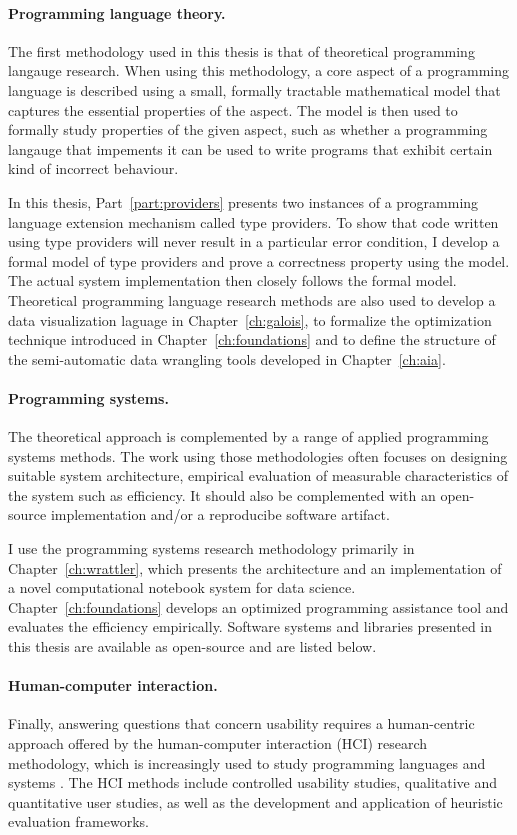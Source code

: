 \documentclass[fleqn,11pt]{report}
\theoremstyle{definition}
\begin{document}
\paragraph{Programming language theory.}
The first methodology used in this thesis is that of theoretical programming langauge research.
When using this methodology, a core aspect of a programming language is described using a small,
formally tractable mathematical model that captures the essential properties of the aspect.
The model is then used to formally study properties of the given aspect, such as whether a
programming langauge that impements it can be used to write programs that exhibit certain kind
of incorrect behaviour.

In this thesis, Part~\ref{part:providers} presents two instances of a programming language
extension mechanism called type providers. To show that code written using type providers will
never result in a particular error condition, I develop a formal model of type providers and prove
a correctness property using the model. The actual system implementation then closely follows the
formal model. Theoretical programming language research methods are also used to develop a data
visualization laguage in Chapter~\ref{ch:galois}, to formalize the optimization technique introduced
in Chapter~\ref{ch:foundations} and to define the structure of the semi-automatic data wrangling
tools developed in Chapter~\ref{ch:aia}.

\paragraph{Programming systems.}
The theoretical approach is complemented by a range of applied programming systems methods.
The work using those methodologies often focuses on designing suitable system architecture,
empirical evaluation of measurable characteristics of the system such as efficiency. It should
also be complemented with an open-source implementation and/or a reproducibe software artifact.

I use the programming systems research methodology primarily in Chapter~\ref{ch:wrattler}, which
presents the architecture and an implementation of a novel computational notebook system for data
science. Chapter~\ref{ch:foundations} develops an optimized programming assistance tool and
evaluates the efficiency empirically. Software systems and libraries presented in this thesis
are available as open-source and are listed below.

\paragraph{Human-computer interaction.}
Finally, answering questions that concern usability requires a human-centric approach offered by
the human-computer interaction (HCI) research methodology, which is increasingly used to study
programming languages and systems \citep{chasins-2021-plhci}. The HCI methods include controlled
usability studies, qualitative and quantitative user studies, as well as the development and
application of heuristic evaluation frameworks.
\end{document}
